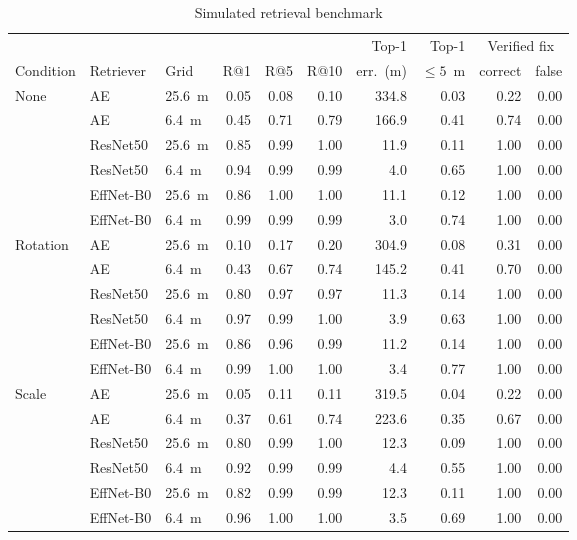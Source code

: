 \documentclass[english, Lau, oneside]{sapthesis}%
\begin{document}
\begin{table}[!htbp]
  \centering
  \caption{Simulated retrieval benchmark}
  \label{tab:retrieval-sim}
  \footnotesize\setlength{\tabcolsep}{3.5pt}
  \begin{tabular}{lllrrrrrrr}
    \toprule
    & & & & & & Top-1 & Top-1 & \multicolumn{2}{c}{Verified fix} \\
    \cmidrule(lr){9-10}
    Condition & Retriever & Grid & R@1 & R@5 & R@10 & err.\ (m) & ${\le}5$~m & correct & false \\
    \midrule
    None & AE & 25.6~m & 0.05 & 0.08 & 0.10 & 334.8 & 0.03 & 0.22 & 0.00 \\
     & AE & 6.4~m & 0.45 & 0.71 & 0.79 & 166.9 & 0.41 & 0.74 & 0.00 \\
     & ResNet50 & 25.6~m & 0.85 & 0.99 & 1.00 & 11.9 & 0.11 & 1.00 & 0.00 \\
     & ResNet50 & 6.4~m & 0.94 & 0.99 & 0.99 & 4.0 & 0.65 & 1.00 & 0.00 \\
     & EffNet-B0 & 25.6~m & 0.86 & 1.00 & 1.00 & 11.1 & 0.12 & 1.00 & 0.00 \\
     & EffNet-B0 & 6.4~m & 0.99 & 0.99 & 0.99 & 3.0 & 0.74 & 1.00 & 0.00 \\
    \addlinespace
    Rotation & AE & 25.6~m & 0.10 & 0.17 & 0.20 & 304.9 & 0.08 & 0.31 & 0.00 \\
     & AE & 6.4~m & 0.43 & 0.67 & 0.74 & 145.2 & 0.41 & 0.70 & 0.00 \\
     & ResNet50 & 25.6~m & 0.80 & 0.97 & 0.97 & 11.3 & 0.14 & 1.00 & 0.00 \\
     & ResNet50 & 6.4~m & 0.97 & 0.99 & 1.00 & 3.9 & 0.63 & 1.00 & 0.00 \\
     & EffNet-B0 & 25.6~m & 0.86 & 0.96 & 0.99 & 11.2 & 0.14 & 1.00 & 0.00 \\
     & EffNet-B0 & 6.4~m & 0.99 & 1.00 & 1.00 & 3.4 & 0.77 & 1.00 & 0.00 \\
    \addlinespace
    Scale & AE & 25.6~m & 0.05 & 0.11 & 0.11 & 319.5 & 0.04 & 0.22 & 0.00 \\
     & AE & 6.4~m & 0.37 & 0.61 & 0.74 & 223.6 & 0.35 & 0.67 & 0.00 \\
     & ResNet50 & 25.6~m & 0.80 & 0.99 & 1.00 & 12.3 & 0.09 & 1.00 & 0.00 \\
     & ResNet50 & 6.4~m & 0.92 & 0.99 & 0.99 & 4.4 & 0.55 & 1.00 & 0.00 \\
     & EffNet-B0 & 25.6~m & 0.82 & 0.99 & 0.99 & 12.3 & 0.11 & 1.00 & 0.00 \\
     & EffNet-B0 & 6.4~m & 0.96 & 1.00 & 1.00 & 3.5 & 0.69 & 1.00 & 0.00 \\

\end{tabular}
\end{table}
\end{document}
